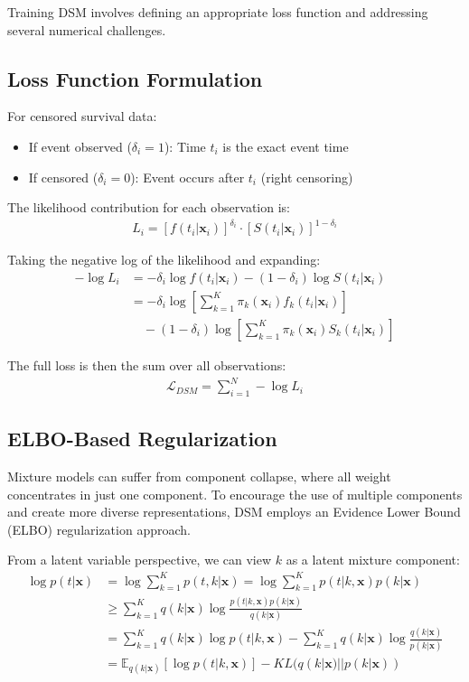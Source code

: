 Training DSM involves defining an appropriate loss function and addressing several numerical challenges.

\subsection{Loss Function Formulation}

For censored survival data:
\begin{itemize}
    \item If event observed ($\delta_i = 1$): Time $t_i$ is the exact event time
    \item If censored ($\delta_i = 0$): Event occurs after $t_i$ (right censoring)
\end{itemize}

The likelihood contribution for each observation is:
\begin{align}
    L_i = [f(t_i|\mathbf{x}_i)]^{\delta_i} \cdot [S(t_i|\mathbf{x}_i)]^{1-\delta_i}
\end{align}

Taking the negative log of the likelihood and expanding:
\begin{align}
    -\log L_i &= -\delta_i \log f(t_i|\mathbf{x}_i) - (1-\delta_i) \log S(t_i|\mathbf{x}_i) \\
    &= -\delta_i \log \left[\sum_{k=1}^{K} \pi_k(\mathbf{x}_i) f_k(t_i|\mathbf{x}_i)\right] \\
    &\quad - (1-\delta_i) \log \left[\sum_{k=1}^{K} \pi_k(\mathbf{x}_i) S_k(t_i|\mathbf{x}_i)\right]
\end{align}

The full loss is then the sum over all observations:
\begin{align}
    \mathcal{L}_{DSM} = \sum_{i=1}^N -\log L_i
\end{align}

\subsection{ELBO-Based Regularization}

Mixture models can suffer from component collapse, where all weight concentrates in just one component. To encourage the use of multiple components and create more diverse representations, DSM employs an Evidence Lower Bound (ELBO) regularization approach.

From a latent variable perspective, we can view $k$ as a latent mixture component:
\begin{align}
    \log p(t|\mathbf{x}) &= \log \sum_{k=1}^K p(t, k|\mathbf{x}) = \log \sum_{k=1}^K p(t|k,\mathbf{x})p(k|\mathbf{x}) \\
    &\geq \sum_{k=1}^K q(k|\mathbf{x}) \log \frac{p(t|k,\mathbf{x})p(k|\mathbf{x})}{q(k|\mathbf{x})} \\
    &= \sum_{k=1}^K q(k|\mathbf{x}) \log p(t|k,\mathbf{x}) - \sum_{k=1}^K q(k|\mathbf{x}) \log \frac{q(k|\mathbf{x})}{p(k|\mathbf{x})} \\
    &= \mathbb{E}_{q(k|\mathbf{x})}[\log p(t|k,\mathbf{x})] - KL(q(k|\mathbf{x})||p(k|\mathbf{x}))
\end{align}

